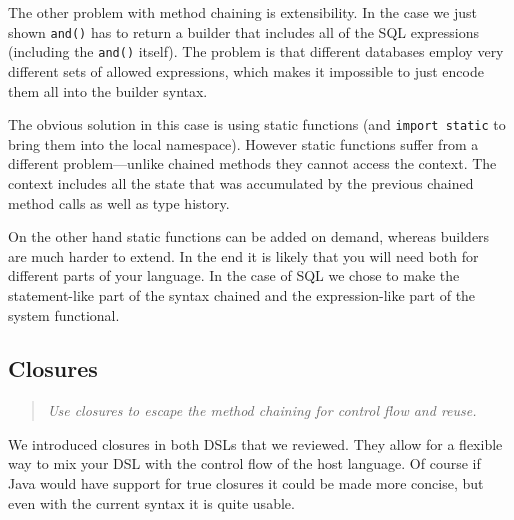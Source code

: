 \documentclass{sig-alternate}
\begin{document}
The other problem with method chaining is extensibility. In the case we just shown \verb!and()! has to return a builder that includes all of the SQL expressions (including the \verb!and()! itself). The problem is that different databases employ very different sets of allowed expressions, which makes it impossible to just encode them all into the builder syntax.

The obvious solution in this case is using static functions (and \verb!import static! to bring them into the local namespace). However static functions suffer from a different problem---unlike chained methods they cannot access the context. The context includes all the state that was accumulated by the previous chained method calls as well as type history. 

On the other hand static functions can be added on demand, whereas builders are much harder to extend. In the end it is likely that you will need both for different parts of your language. In the case of SQL we chose to make the statement-like part of the syntax chained and the expression-like part of the system functional.

\subsection{Closures}

\begin{quote}
\emph{Use closures to escape the method chaining for control flow and reuse.}
\end{quote}

We introduced closures in both DSLs that we reviewed. They allow for a flexible way to mix your DSL with the control flow of the host language. Of course if Java would have support for true closures it could be made more concise, but even with the current syntax it is quite usable.

\end{document}
